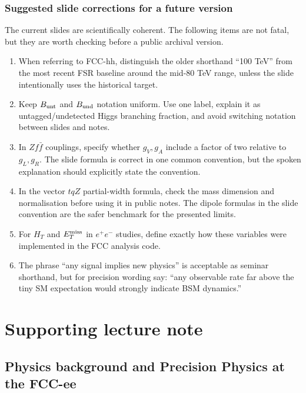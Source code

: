 \documentclass[11pt,a4paper]{report}
\newcommand{\ee}{e^+e^-}
\begin{document}
\section{Suggested slide corrections for a future version}
\begin{warningbox}
The current slides are scientifically coherent.  The following items are not fatal, but they are worth checking before a public archival version.
\end{warningbox}
\begin{enumerate}
\item When referring to FCC-hh, distinguish the older shorthand ``100 TeV'' from the most recent FSR baseline around the mid-80 TeV range, unless the slide intentionally uses the historical target.
\item Keep $B_{\rm unt}$ and $B_{\rm und}$ notation uniform.  Use one label, explain it as untagged/undetected Higgs branching fraction, and avoid switching notation between slides and notes.
\item In $Zf\bar f$ couplings, specify whether $g_V,g_A$ include a factor of two relative to $g_L,g_R$.  The slide formula is correct in one common convention, but the spoken explanation should explicitly state the convention.
\item In the vector $tqZ$ partial-width formula, check the mass dimension and normalisation before using it in public notes.  The dipole formulas in the slide convention are the safer benchmark for the presented limits.
\item For $H_T$ and $E_T^{\rm miss}$ in $\ee$ studies, define exactly how these variables were implemented in the FCC analysis code.
\item The phrase ``any signal implies new physics'' is acceptable as seminar shorthand, but for precision wording say: ``any observable rate far above the tiny SM expectation would strongly indicate BSM dynamics.''
\end{enumerate}





\part{Supporting lecture note}

\chapter{Physics background and Precision Physics at the FCC-ee}
\end{document}
